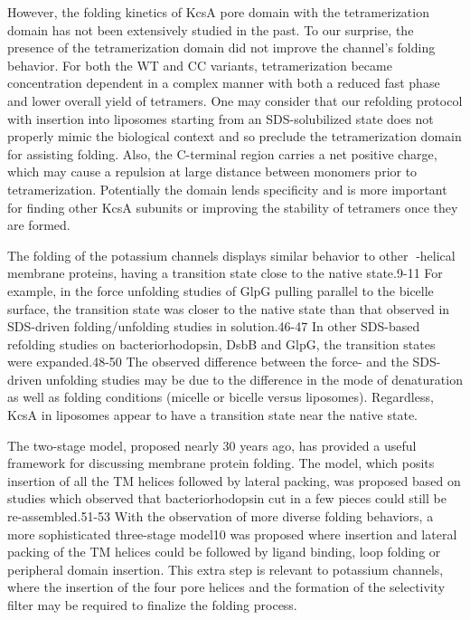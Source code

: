 However, the folding kinetics of KcsA pore domain with the tetramerization domain has not been extensively studied in the past. To our surprise, the presence of the tetramerization domain did not improve the channel’s folding behavior. For both the WT and CC variants, tetramerization became concentration dependent in a complex manner with both a reduced fast phase and lower overall yield of tetramers. One may consider that our refolding protocol with insertion into liposomes starting from an SDS-solubilized state does not properly mimic the biological context and so preclude the tetramerization domain for assisting folding. Also, the C-terminal region carries a net positive charge, which may cause a repulsion at large distance between monomers prior to tetramerization. Potentially the domain lends specificity and is more important for finding other KcsA subunits or improving the stability of tetramers once they are formed.

The folding of the potassium channels displays similar behavior to other -helical membrane proteins, having a transition state close to the native state.9-11 For example, in the force unfolding studies of GlpG pulling parallel to the bicelle surface, the transition state was closer to the native state than that observed in SDS-driven folding/unfolding studies in solution.46-47 In other SDS-based refolding studies on bacteriorhodopsin, DsbB and GlpG, the transition states were expanded.48-50 The observed difference between the force- and the SDS-driven unfolding studies may be due to the difference in the mode of denaturation as well as folding conditions (micelle or bicelle versus liposomes). Regardless, KcsA in liposomes appear to have a transition state near the native state.

The two-stage model, proposed nearly 30 years ago, has provided a useful framework for discussing membrane protein folding. The model, which posits insertion of all the TM helices followed by lateral packing, was proposed based on studies which observed that bacteriorhodopsin cut in a few pieces could still be re-assembled.51-53 With the observation of more diverse folding behaviors, a more sophisticated three-stage model10 was proposed where insertion and lateral packing of the TM helices could be followed by ligand binding, loop folding or peripheral domain insertion. This extra step is relevant to potassium channels, where the insertion of the four pore helices and the formation of the selectivity filter may be required to finalize the folding process.

